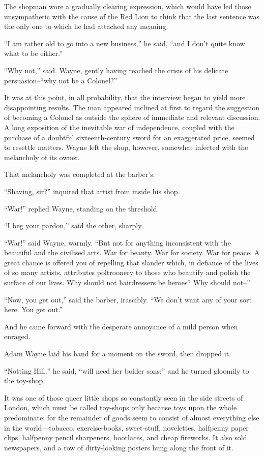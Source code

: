 \documentclass{book}
\begin{document}
The shopman wore a gradually clearing expression, which would have led those unsympathetic with the cause of the Red Lion to think that the last sentence was the only one to which he had attached any meaning.

“I am rather old to go into a new business,” he said, “and I don’t quite know what to be either.”

“Why not,” said. Wayne, gently having reached the crisis of his delicate persuasion–“why not be a Colonel?”

It was at this point, in all probability, that the interview began to yield more disappointing results. The man appeared inclined at first to regard the suggestion of becoming a Colonel as outside the sphere of immediate and relevant discussion. A long exposition of the inevitable war of independence, coupled with the purchase of a doubtful sixteenth-century sword for an exaggerated price, seemed to resettle matters. Wayne left the shop, however, somewhat infected with the melancholy of its owner.

That melancholy was completed at the barber’s.

“Shaving, sir?” inquired that artist from inside his shop.

“War!” replied Wayne, standing on the threshold.

“I beg your pardon,” said the other, sharply.

“War!” said Wayne, warmly. “But not for anything inconsistent with the beautiful and the civilised arts. War for beauty. War for society. War for peace. A great chance is offered you of repelling that slander which, in defiance of the lives of so many artists, attributes poltroonery to those who beautify and polish the surface of our lives. Why should not hairdressers be heroes? Why should not–”

“Now, you get out,” said the barber, irascibly. “We don’t want any of your sort here. You get out.”

And he came forward with the desperate annoyance of a mild person when enraged.

Adam Wayne laid his hand for a moment on the sword, then dropped it.

“Notting Hill,” he said, “will need her bolder sons;” and he turned gloomily to the toy-shop.

It was one of those queer little shops so constantly seen in the side streets of London, which must be called toy-shops only because toys upon the whole predominate; for the remainder of goods seem to consist of almost everything else in the world—tobacco, exercise-books, sweet-stuff, novelettes, halfpenny paper clips, halfpenny pencil sharpeners, bootlaces, and cheap fireworks. It also sold newspapers, and a row of dirty-looking posters hung along the front of it.
\end{document}
